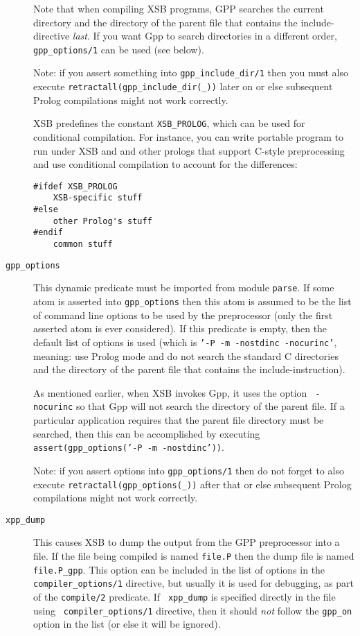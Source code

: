 \begin{description}
  Note that when compiling XSB programs, GPP searches the current
  directory and the directory of the parent file that contains the
  include-directive \emph{last}. 
  If you want Gpp to search directories in a different order,
  {\tt gpp\_options/1} can be used (see below).

  Note: if you assert something into \texttt{gpp\_include\_dir/1} then you
  must also execute {\tt retractall(gpp\_include\_dir(\_))} later on or
  else subsequent Prolog compilations might not work correctly.

  XSB predefines the constant {\tt XSB\_PROLOG}, which can be used for
  conditional compilation. For instance, you can write portable program
  to run under XSB and and other prologs that support C-style
  preprocessing and use conditional compilation to account for the
  differences: 
  \begin{samepage}
  \begin{verbatim}
#ifdef XSB_PROLOG
    XSB-specific stuff
#else
    other Prolog's stuff
#endif
    common stuff
  \end{verbatim}
  \end{samepage}

\item[{\tt gpp\_options}]  This dynamic predicate
  must be imported from module {\tt parse}.  If some atom is asserted into
  {\tt gpp\_options} then this atom is assumed to be the list of command
  line options to be used by the preprocessor (only the first asserted atom
  is ever considered). If this predicate is empty, then the default list of
  options is used (which is {\tt '-P -m -nostdinc -nocurinc'}, meaning: use
  Prolog mode and do not search the standard C directories and the
  directory of the parent file that contains the include-instruction).
  
  As mentioned earlier, when XSB invokes Gpp, it uses the option {\tt
    -nocurinc} so that Gpp will not search the directory of the parent file. 
  If a particular application requires that the parent file directory
  must be searched, then this can be accomplished by executing 
  {\tt assert(gpp\_options('-P -m -nostdinc'))}.
  
  Note: if you assert options into \texttt{gpp\_options/1} then do not
  forget to
  also execute \texttt{retractall(gpp\_options(\_))} after that or else
  subsequent Prolog compilations might not work correctly.
  
\item[{\tt xpp\_dump}] 
  This causes XSB to dump the output from the GPP preprocessor into a file.
  If the file being compiled is named {\tt file.P} then the dump file is
  named {\tt file.P\_gpp}. This option can be included in the list of
  options in the {\tt compiler\_options/1} directive, but usually it is
  used for debugging, as part of the {\tt compile/2} predicate. If {\tt
    xpp\_dump} is specified directly in the file using {\tt
    compiler\_options/1} directive, then it should \emph{not} follow the
  {\tt gpp\_on} option in the list (or else it will be ignored).


\end{description}
